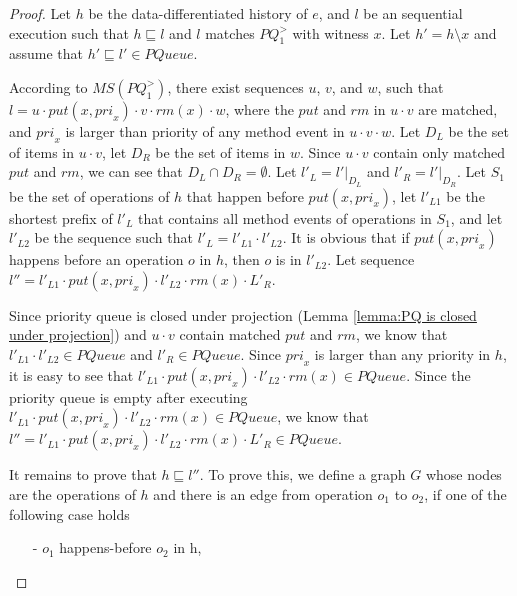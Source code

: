 \begin {proof}

Let $h$ be the data-differentiated history of $e$, and $l$ be an sequential execution such that $h \sqsubseteq l$ and $l$ matches $\textit{PQ}_1^{>}$ with witness $x$. Let $h'=h \setminus x$ and assume that $h' \sqsubseteq l' \in \textit{PQueue}$.

According to $\textit{MS}(\textit{PQ}_1^{>})$, there exist sequences $u$, $v$, and $w$, such that $l=u \cdot \textit{put}(x,\textit{pri}_x) \cdot v \cdot \textit{rm}(x) \cdot w$, where the $\textit{put}$ and $\textit{rm}$ in $u \cdot v$ are matched, and $\textit{pri}_x$ is larger than priority of any method event in $u \cdot v \cdot w$. Let $D_L$ be the set of items in $u \cdot v$, let $D_R$ be the set of items in $w$. Since $u \cdot v$ contain only matched $\textit{put}$ and $\textit{rm}$, we can see that $D_L \cap D_R = \emptyset$. Let $l'_L = l' \vert_{D_L}$ and $l'_R = l' \vert_{D_R}$. Let $S_1$ be the set of operations of $h$ that happen before $\textit{put}(x,\textit{pri}_x)$, let $l'_{L1}$ be the shortest prefix of $l'_L$ that contains all method events of operations in $S_1$, and let $l'_{L2}$ be the sequence such that $l'_L = l'_{L1} \cdot l'_{L2}$. It is obvious that if $\textit{put}(x,\textit{pri}_x)$ happens before an operation $o$ in $h$, then $o$ is in $l'_{L2}$. Let sequence $l'' = l'_{L1} \cdot \textit{put}(x,\textit{pri}_x) \cdot l'_{L2} \cdot \textit{rm}(x) \cdot L'_R$.

Since priority queue is closed under projection (Lemma \ref{lemma:PQ is closed under projection}) and $u \cdot v$ contain matched $\textit{put}$ and $\textit{rm}$, we know that $l'_{L1} \cdot l'_{L2} \in \textit{PQueue}$ and $l'_R \in \textit{PQueue}$. Since $\textit{pri}_x$ is larger than any priority in $h$, it is easy to see that $l'_{L1} \cdot \textit{put}(x,\textit{pri}_x) \cdot l'_{L2} \cdot \textit{rm}(x) \in \textit{PQueue}$. Since the priority queue is empty after executing $l'_{L1} \cdot \textit{put}(x,\textit{pri}_x) \cdot l'_{L2} \cdot \textit{rm}(x) \in \textit{PQueue}$, we know that $l'' = l'_{L1} \cdot \textit{put}(x,\textit{pri}_x) \cdot l'_{L2} \cdot \textit{rm}(x) \cdot L'_R \in \textit{PQueue}$.

It remains to prove that $h \sqsubseteq l''$. To prove this, we define a graph $G$ whose nodes are the operations of $h$ and there is an edge from operation $o_1$ to $o_2$, if one of the following case holds

\begin{itemize}
\setlength{\itemsep}{0.5pt}
\item[-] $o_1$ happens-before $o_2$ in h,


\end{itemize}
\end{proof}
